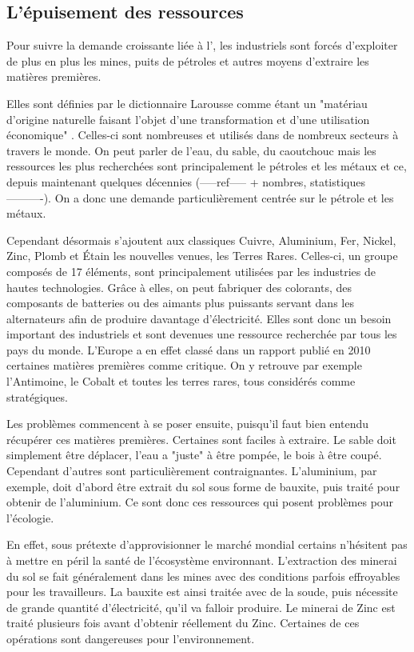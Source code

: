 \subsection{L’épuisement des ressources}

Pour suivre la demande croissante liée à l'\op, les industriels sont forcés d'exploiter de plus en plus les mines, puits de pétroles et autres moyens d’extraire les matières premières.

\medbreak Elles sont définies par le dictionnaire Larousse comme étant un "matériau d'origine naturelle faisant l'objet d'une transformation et d'une utilisation économique" \cite{LarousseMatiere1eres}. Celles-ci sont nombreuses et utilisés dans de nombreux secteurs à travers le monde. On peut parler de l'eau, du sable, du caoutchouc mais les ressources les plus recherchées sont principalement le pétroles et les métaux et ce, depuis maintenant quelques décennies (-----ref----- + nombres, statistiques----------). On a donc une demande particulièrement centrée sur le pétrole et les métaux.

Cependant désormais s'ajoutent aux classiques Cuivre, Aluminium, Fer, Nickel, Zinc, Plomb et Étain les nouvelles venues, les Terres Rares. Celles-ci, un groupe composés de 17 éléments, sont principalement utilisées par les industries de hautes technologies. Grâce à elles, on peut fabriquer des colorants, des composants de batteries ou des aimants plus puissants servant dans les alternateurs afin de produire davantage d’électricité. Elles sont donc un besoin important des industriels et sont devenues une ressource recherchée par tous les pays du monde. L'Europe a en effet classé dans un rapport publié en 2010 \cite{RapportEuropeenTerresRares} certaines matières premières comme critique. On y retrouve par exemple l'Antimoine, le Cobalt et toutes les terres rares, tous considérés comme stratégiques.


\medbreak Les problèmes commencent à se poser ensuite, puisqu'il faut bien entendu récupérer ces matières premières. Certaines sont faciles à extraire. Le sable doit simplement être déplacer, l'eau a "juste" à être pompée, le bois à être coupé. Cependant d'autres sont particulièrement contraignantes. L'aluminium, par exemple, doit d'abord être extrait du sol sous forme de bauxite, puis traité pour obtenir de l'aluminium. Ce sont donc ces ressources qui posent problèmes pour l'écologie.

En effet, sous prétexte d'approvisionner le marché mondial certains n'hésitent pas à mettre en péril la santé de l'écosystème environnant. L'extraction des minerai du sol se fait généralement dans les mines avec des conditions parfois effroyables pour les travailleurs. La bauxite est ainsi traitée avec de la soude, puis nécessite de grande quantité d’électricité, qu'il va falloir produire. Le minerai de Zinc est traité plusieurs fois avant d'obtenir réellement du Zinc. Certaines de ces opérations sont dangereuses pour l'environnement.

